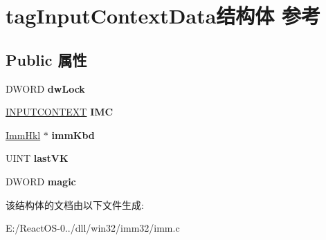 \hypertarget{structtag_input_context_data}{}\section{tag\+Input\+Context\+Data结构体 参考}
\label{structtag_input_context_data}
\subsection*{Public 属性}
\begin{DoxyCompactItemize}
\item 
\mbox{\label{structtag_input_context_data_a3f4a9297bf02d40f9e49bdaca3280a8c}} 
D\+W\+O\+RD {\bfseries dw\+Lock}
\item 
\mbox{\label{structtag_input_context_data_a75ddb2beb64a44272f8441ed9b12b905}} 
\hyperlink{struct__tag_i_n_p_u_t_c_o_n_t_e_x_t}{I\+N\+P\+U\+T\+C\+O\+N\+T\+E\+XT} {\bfseries I\+MC}
\item 
\mbox{\label{structtag_input_context_data_a5f271cae4ac23a6cf4575f9fe445fc86}} 
\hyperlink{struct__tag_imm_hkl}{Imm\+Hkl} $\ast$ {\bfseries imm\+Kbd}
\item 
\mbox{\label{structtag_input_context_data_a871a729dea86c0fffcc1d2057654faef}} 
U\+I\+NT {\bfseries last\+VK}
\item 
\mbox{\label{structtag_input_context_data_a708d1fa39651c4ea0ce1d32ca89b35f7}} 
D\+W\+O\+RD {\bfseries magic}
\end{DoxyCompactItemize}


该结构体的文档由以下文件生成\+:\begin{DoxyCompactItemize}
\item 
E\+:/\+React\+O\+S-\/0../dll/win32/imm32/imm.\+c\end{DoxyCompactItemize}

